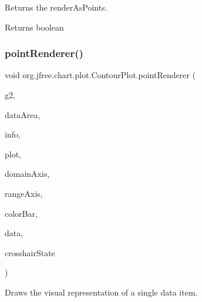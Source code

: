 Returns the render\+As\+Points. \begin{DoxyReturn}{Returns}
boolean 
\end{DoxyReturn}
\mbox{\label{classorg_1_1jfree_1_1chart_1_1plot_1_1_contour_plot_aba5e59055ea664fb00f2371d2b4b1699}} 
\subsubsection{\texorpdfstring{point\+Renderer()}{pointRenderer()}}
{\footnotesize\ttfamily void org.\+jfree.\+chart.\+plot.\+Contour\+Plot.\+point\+Renderer (\begin{DoxyParamCaption}\item[{Graphics2D}]{g2,  }\item[{Rectangle2D}]{data\+Area,  }\item[{\mbox{\hyperlink{classorg_1_1jfree_1_1chart_1_1plot_1_1_plot_rendering_info}{Plot\+Rendering\+Info}}}]{info,  }\item[{\mbox{\hyperlink{classorg_1_1jfree_1_1chart_1_1plot_1_1_contour_plot}{Contour\+Plot}}}]{plot,  }\item[{\mbox{\hyperlink{classorg_1_1jfree_1_1chart_1_1axis_1_1_value_axis}{Value\+Axis}}}]{domain\+Axis,  }\item[{\mbox{\hyperlink{classorg_1_1jfree_1_1chart_1_1axis_1_1_value_axis}{Value\+Axis}}}]{range\+Axis,  }\item[{\mbox{\hyperlink{classorg_1_1jfree_1_1chart_1_1axis_1_1_color_bar}{Color\+Bar}}}]{color\+Bar,  }\item[{\mbox{\hyperlink{interfaceorg_1_1jfree_1_1data_1_1contour_1_1_contour_dataset}{Contour\+Dataset}}}]{data,  }\item[{\mbox{\hyperlink{classorg_1_1jfree_1_1chart_1_1plot_1_1_crosshair_state}{Crosshair\+State}}}]{crosshair\+State }\end{DoxyParamCaption})}

Draws the visual representation of a single data item.


